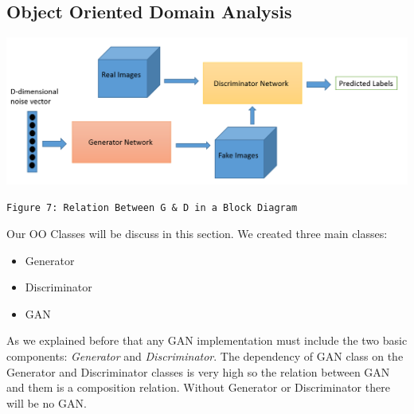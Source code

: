 \documentclass[12pt]{article}
\begin{document}
		\subsection{Object Oriented Domain Analysis}
			\begin{center}
				\vspace{0.1in}
				\includegraphics[width=6in]{Images/GANBlockDiagram.png}
				
				\texttt{Figure 7: Relation Between G \& D in a Block Diagram}
				\vspace{0.1in}
			\end{center}
			Our OO Classes will be discuss in this section. We created three main classes:
			\begin{itemize}
				\item Generator
				\item Discriminator
				\item GAN
			\end{itemize}
			
			As we explained before that any GAN implementation must include the two basic components: \textit{Generator} and \textit{Discriminator}. The dependency of GAN class on the Generator and Discriminator classes is very high so the relation between GAN and them is a composition relation. Without Generator or Discriminator there will be no GAN.
			
\end{document}
